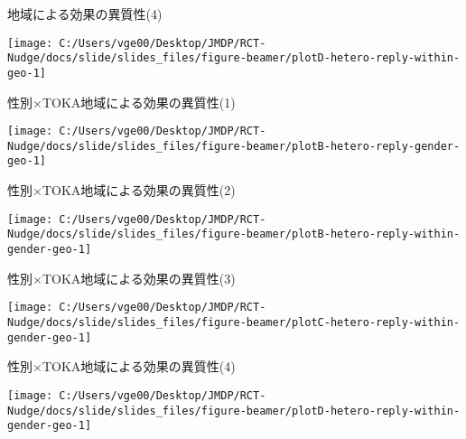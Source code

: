 \documentclass[
      aspectratio=169,
        12pt,
    ]{beamer}
\begin{document}
\begin{frame}{地域による効果の異質性(4)}
\protect\hypertarget{ux5730ux57dfux306bux3088ux308bux52b9ux679cux306eux7570ux8ceaux60274}{}
\begin{center}\texttt{[image: C:/Users/vge00/Desktop/JMDP/RCT-Nudge/docs/slide/slides\_files/figure-beamer/plotD-hetero-reply-within-geo-1]} \end{center}
\end{frame}

\begin{frame}{性別×TOKA地域による効果の異質性(1)}
\protect\hypertarget{ux6027ux5225tokaux5730ux57dfux306bux3088ux308bux52b9ux679cux306eux7570ux8ceaux60271}{}
\begin{center}\texttt{[image: C:/Users/vge00/Desktop/JMDP/RCT-Nudge/docs/slide/slides\_files/figure-beamer/plotB-hetero-reply-gender-geo-1]} \end{center}
\end{frame}

\begin{frame}{性別×TOKA地域による効果の異質性(2)}
\protect\hypertarget{ux6027ux5225tokaux5730ux57dfux306bux3088ux308bux52b9ux679cux306eux7570ux8ceaux60272}{}
\begin{center}\texttt{[image: C:/Users/vge00/Desktop/JMDP/RCT-Nudge/docs/slide/slides\_files/figure-beamer/plotB-hetero-reply-within-gender-geo-1]} \end{center}
\end{frame}

\begin{frame}{性別×TOKA地域による効果の異質性(3)}
\protect\hypertarget{ux6027ux5225tokaux5730ux57dfux306bux3088ux308bux52b9ux679cux306eux7570ux8ceaux60273}{}
\begin{center}\texttt{[image: C:/Users/vge00/Desktop/JMDP/RCT-Nudge/docs/slide/slides\_files/figure-beamer/plotC-hetero-reply-within-gender-geo-1]} \end{center}
\end{frame}

\begin{frame}{性別×TOKA地域による効果の異質性(4)}
\protect\hypertarget{ux6027ux5225tokaux5730ux57dfux306bux3088ux308bux52b9ux679cux306eux7570ux8ceaux60274}{}
\begin{center}\texttt{[image: C:/Users/vge00/Desktop/JMDP/RCT-Nudge/docs/slide/slides\_files/figure-beamer/plotD-hetero-reply-within-gender-geo-1]} \end{center}
\end{frame}
\end{document}
